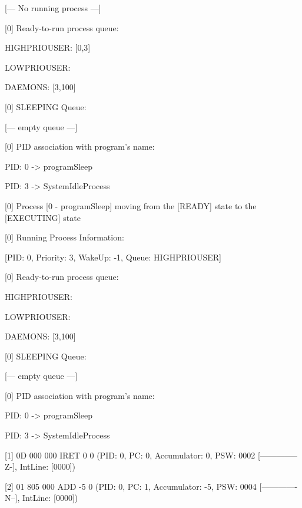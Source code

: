 		[--- No running process ---]

	[\textcolor{termred}{0}] Ready-to-run process queue:

 		HIGHPRIOUSER: [\textcolor{termgreen}{0},3]

		LOWPRIOUSER: 

		DAEMONS: [\textcolor{termgreen}{3},100]

	[\textcolor{termred}{0}] SLEEPING Queue:

		[--- empty queue ---]

	[\textcolor{termred}{0}] PID association with program's name:

		PID: \textcolor{termgreen}{0} -> programSleep

		PID: \textcolor{termgreen}{3} -> SystemIdleProcess

	[\textcolor{termred}{0}] Process [\textcolor{termgreen}{0} - \textcolor{termgreen}{programSleep}] moving from the [\textcolor{termgreen}{READY}] state to the [\textcolor{termgreen}{EXECUTING}] state

	[\textcolor{termred}{0}] Running Process Information:

		[PID: \textcolor{termgreen}{0}, Priority: 3, WakeUp: \textcolor{termred}{-1}, Queue: HIGHPRIOUSER]

	[\textcolor{termred}{0}] Ready-to-run process queue:

 		HIGHPRIOUSER: 

		LOWPRIOUSER: 

		DAEMONS: [\textcolor{termgreen}{3},100]

	[\textcolor{termred}{0}] SLEEPING Queue:

		[--- empty queue ---]

	[\textcolor{termred}{0}] PID association with program's name:

		PID: \textcolor{termgreen}{0} -> programSleep

		PID: \textcolor{termgreen}{3} -> SystemIdleProcess

[\textcolor{termred}{1}] {0D 000 000} IRET 0 0 (PID: \textcolor{termgreen}{0}, PC: \textcolor{termred}{0}, Accumulator: \textcolor{termred}{0}, PSW: \textcolor{termred}{0002} [\textcolor{termred}{--------------Z-}], IntLine: [\textcolor{termred}{0000}])

[2] {01 805 000} ADD -5 0 (PID: \textcolor{termgreen}{0}, PC: \textcolor{termred}{1}, Accumulator: \textcolor{termred}{-5}, PSW: \textcolor{termred}{0004} [\textcolor{termred}{-------------N--}], IntLine: [\textcolor{termred}{0000}])

